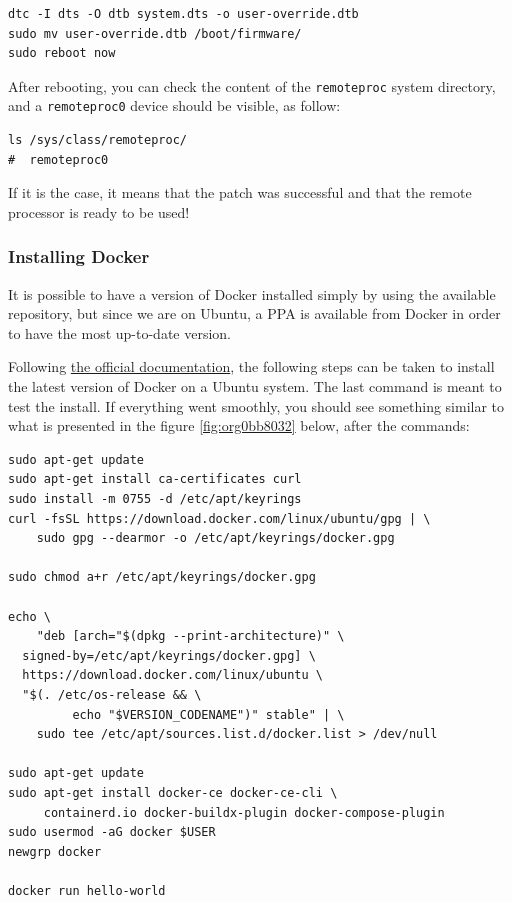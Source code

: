 \documentclass[10pt]{article}
\begin{document}
\begin{verbatim}
dtc -I dts -O dtb system.dts -o user-override.dtb
sudo mv user-override.dtb /boot/firmware/
sudo reboot now
\end{verbatim}

After rebooting, you can check the content of the \verb|remoteproc| system directory,
and a \texttt{remoteproc0} device should be visible, as follow:

\begin{verbatim}
ls /sys/class/remoteproc/
#  remoteproc0
\end{verbatim}

If it is the case, it means that the patch was successful and  that the remote processor is
ready to be used!
\pagebreak

\subsubsection{Installing Docker}
\label{sec:org470b97c}
It is possible to have a version of Docker installed simply by using the available repository,
but since we are on Ubuntu, a PPA is available from Docker in order to have the most up-to-date version.

Following \href{https://docs.docker.com/engine/install/ubuntu/\#install-using-the-repository}{the official documentation}, the following steps can be taken to install the latest version of
Docker on a Ubuntu system. The last command is meant to test the install.
If everything went smoothly, you should see something similar to what is presented
in the figure \ref{fig:org0bb8032} below, after the commands:

\begin{verbatim}
sudo apt-get update
sudo apt-get install ca-certificates curl
sudo install -m 0755 -d /etc/apt/keyrings
curl -fsSL https://download.docker.com/linux/ubuntu/gpg | \
    sudo gpg --dearmor -o /etc/apt/keyrings/docker.gpg

sudo chmod a+r /etc/apt/keyrings/docker.gpg

echo \
    "deb [arch="$(dpkg --print-architecture)" \
  signed-by=/etc/apt/keyrings/docker.gpg] \
  https://download.docker.com/linux/ubuntu \
  "$(. /etc/os-release && \
         echo "$VERSION_CODENAME")" stable" | \
    sudo tee /etc/apt/sources.list.d/docker.list > /dev/null

sudo apt-get update
sudo apt-get install docker-ce docker-ce-cli \
     containerd.io docker-buildx-plugin docker-compose-plugin
sudo usermod -aG docker $USER
newgrp docker

docker run hello-world
\end{verbatim}
\end{document}
